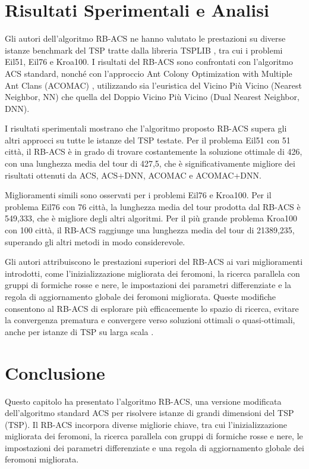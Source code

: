 \section{Risultati Sperimentali e Analisi}
Gli autori dell'algoritmo \gls{RB-ACS} ne hanno valutato le prestazioni su diverse istanze benchmark del \gls{TSP} tratte dalla libreria \gls{TSP}LIB \cite{TSPLIB}, tra cui i problemi Eil51, Eil76 e Kroa100. I risultati del \gls{RB-ACS} sono confrontati con l'algoritmo  \gls{ACS} standard, nonché con l'approccio Ant Colony Optimization with Multiple Ant Clans (\gls{ACOMAC}) \cite{Tsai2002}, utilizzando sia l'euristica del Vicino Più Vicino (Nearest Neighbor, NN) che quella del Doppio Vicino Più Vicino (Dual Nearest Neighbor, \gls{DNN}).

I risultati sperimentali mostrano che l'algoritmo proposto \gls{RB-ACS} supera gli altri approcci su tutte le istanze del \gls{TSP} testate. Per il problema Eil51 con 51 città, il \gls{RB-ACS} è in grado di trovare costantemente la soluzione ottimale di 426, con una lunghezza media del tour di 427,5, che è significativamente migliore dei risultati ottenuti da  \gls{ACS},  \gls{ACS}+\gls{DNN}, \gls{ACOMAC} e \gls{ACOMAC}+\gls{DNN}.

Miglioramenti simili sono osservati per i problemi Eil76 e Kroa100. Per il problema Eil76 con 76 città, la lunghezza media del tour prodotta dal \gls{RB-ACS} è 549,333, che è migliore degli altri algoritmi. Per il più grande problema Kroa100 con 100 città, il \gls{RB-ACS} raggiunge una lunghezza media del tour di 21389,235, superando gli altri metodi in modo considerevole.

Gli autori attribuiscono le prestazioni superiori del \gls{RB-ACS} ai vari miglioramenti introdotti, come l'inizializzazione migliorata dei feromoni, la ricerca parallela con gruppi di formiche rosse e nere, le impostazioni dei parametri differenziate e la regola di aggiornamento globale dei feromoni migliorata. Queste modifiche consentono al \gls{RB-ACS} di esplorare più efficacemente lo spazio di ricerca, evitare la convergenza prematura e convergere verso soluzioni ottimali o quasi-ottimali, anche per istanze di \gls{TSP} su larga scala \cite{Hassan2013}.

\section{Conclusione}
Questo capitolo ha presentato l'algoritmo \gls{RB-ACS}, una versione modificata dell'algoritmo standard \gls{ACS} per risolvere istanze di grandi dimensioni del  \gls{TSP} (TSP). Il \gls{RB-ACS} incorpora diverse migliorie chiave, tra cui l'inizializzazione migliorata dei feromoni, la ricerca parallela con gruppi di formiche rosse e nere, le impostazioni dei parametri differenziate e una regola di aggiornamento globale dei feromoni migliorata.

